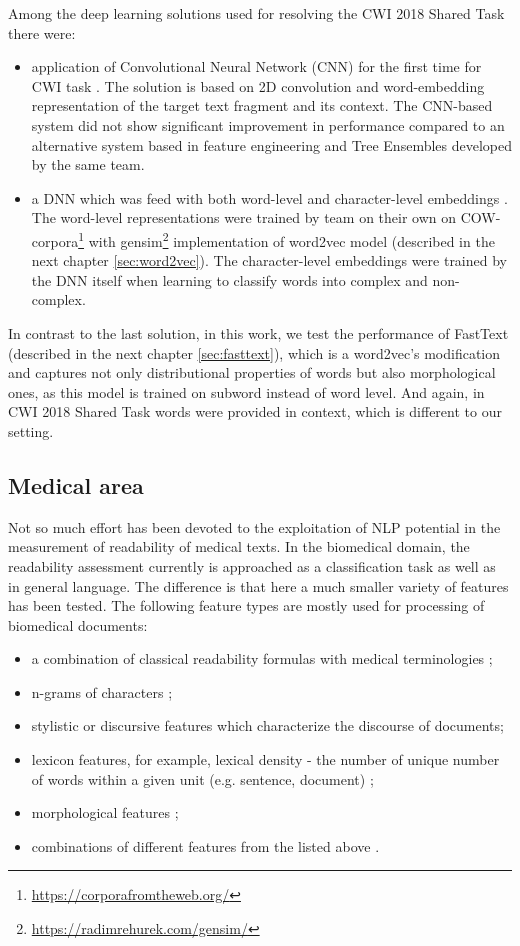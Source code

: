 Among the deep learning solutions used for resolving the CWI 2018 Shared Task  there were:
\begin{itemize}
    \item application of Convolutional Neural Network (CNN) for the first time for CWI task \citep{Aroyehun-BEA2018}. The solution is based on 2D convolution and word-embedding representation of the target text fragment and its context. The CNN-based system did not show significant improvement in performance compared to an alternative system based in feature engineering and Tree Ensembles developed by the same team. 
    
    \item a DNN which was feed with both word-level and character-level embeddings \citep{DeHertog-ACL2018}. The word-level representations were trained by team on their own on COW-corpora\footnote{\url{https://corporafromtheweb.org/}} with gensim\footnote{\url{https://radimrehurek.com/gensim/}} implementation of word2vec model (described in the next chapter \ref{sec:word2vec}). The character-level embeddings were trained by the DNN itself when learning to classify words into complex and non-complex.
\end{itemize}

In contrast to the last solution, in this work, we test the performance of FastText (described in the next chapter \ref{sec:fasttext}), which is a word2vec's modification and captures not only distributional properties of words but also morphological ones, as this model is trained on subword instead of word level. And again, in  CWI 2018 Shared Task words were provided in context, which is different to our setting.


\subsection{Medical area}
Not so much effort has been devoted to the exploitation of NLP potential in the measurement of readability of medical texts.
In the biomedical domain, the readability assessment currently is approached as a classification task as well as in general language. The difference is that here a much smaller variety of features has been tested. The following feature types are mostly used for processing of biomedical documents:
\begin{itemize}
    \item a combination of classical readability formulas
with medical terminologies \citep{Kokkinakis-2006};
    \item n-grams of characters \citep{Poprat-MIE2006}; 
    \item stylistic \citep{Grabar-AMIA2007} or discursive \citep{Goeuriot-LREC2008} features which characterize the discourse of documents;
    \item lexicon features, for example, lexical density - the number of unique number of words within a given unit (e.g. sentence, document) \citep{Miller-HICSS2007};
    \item morphological features \citep{Chmielik-TAL2011};
    \item combinations of different features from the listed above
    \citep{Zeng-MEDINFO2007}.
\end{itemize}

